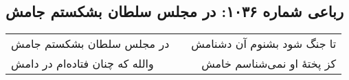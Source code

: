 \begin{center}
\section*{رباعی شماره ۱۰۳۶: در مجلس سلطان بشکستم جامش}
\label{sec:1036}
\begin{longtable}{l p{0.5cm} r}
در مجلس سلطان بشکستم جامش
&&
تا جنگ شود بشنوم آن دشنامش
\\
والله که چنان فتاده‌ام در دامش
&&
کز پختهٔ او نمی‌شناسم خامش
\\
\end{longtable}
\end{center}
